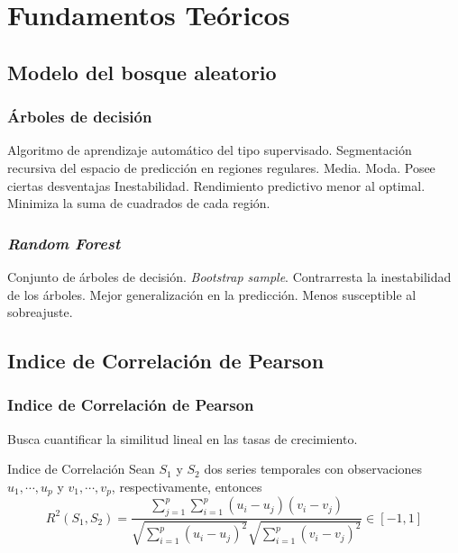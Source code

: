 \documentclass{beamer}
\begin{document}
  \section{Fundamentos Teóricos}

  \subsection*{Modelo del bosque aleatorio}

  \begin{frame}
    \frametitle{Árboles de decisión}

    \begin{outline}
      \1  Algoritmo de aprendizaje automático del tipo supervisado.
      \1 Segmentación recursiva del espacio de predicción en regiones regulares.
        \2 Media. 
        \2 Moda.
      \1 Posee ciertas desventajas
        \2 Inestabilidad.
        \2 Rendimiento predictivo menor al optimal.
      \1 Minimiza la suma de cuadrados de cada región.
    \end{outline}
  \end{frame}

  \begin{frame}
    \frametitle{\textit{Random Forest}}

    \begin{outline}
      \1 Conjunto de árboles de decisión.
        \2 \textit{Bootstrap sample}.
      \1 Contrarresta la inestabilidad de los árboles.
      \1 Mejor generalización en la predicción.
      \1 Menos susceptible al sobreajuste.
    \end{outline}
  \end{frame}

  \subsection*{Indice de Correlación de Pearson}

  \begin{frame}
    \frametitle{Indice de Correlación de Pearson}

    \begin{outline}
      \1 Busca cuantificar la similitud lineal en las tasas de crecimiento.
    \end{outline}

    \begin{block}{Indice de Correlación}
      Sean $ S_1 $ y $ S_2 $ dos series temporales con observaciones $ u_1,\cdots, u_p $ y $ v_1,\cdots,v_p $, respectivamente, entonces
      $$ R^2(S_1,S_2) = \frac{\sum_{j=1}^p\sum_{i=1}^p(u_i-u_j)(v_i-v_j)} {\sqrt{\sum_{i=1}^p(u_i-u_j)^2}\sqrt{\sum_{i=1}^p(v_i-v_j)^2}} \in [-1,1]$$
    \end{block}

  \end{frame}
\end{document}
